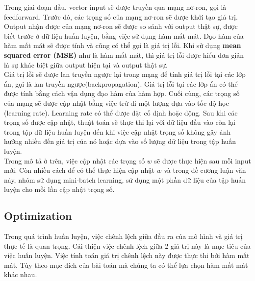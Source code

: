 Trong giai đoạn đầu, vector input sẽ được truyền qua mạng nơ-ron, gọi là feedforward. Trước đó, các trọng số của mạng nơ-ron sẽ được khởi tạo giá trị. Output nhận được của mạng nơ-ron sẽ được so sánh với output thật sự, được biết trước ở dữ liệu huấn luyện, bằng việc sử dụng hàm mất mát. Đạo hàm của hàm mất mát sẽ được tính và cũng có thể gọi là giá trị lỗi. Khi sử dụng \textbf{mean squared error (MSE)} như là hàm mất mát, thì giá trị lỗi được hiểu đơn giản là sự khác biệt giữa output hiện tại và output thật sự. \\

Giá trị lỗi sẽ được lan truyền ngược lại trong mạng để tính giá trị lỗi tại các lớp ẩn, gọi là lan truyền ngược(backpropagation). Giá trị lỗi tại các lớp ẩn có thể được tính bằng cách vận dụng đạo hàm của hàm hợp. Cuối cùng, các trọng số của mạng sẽ được cập nhật bằng việc trừ đi một lượng dựa vào tốc độ học (learning rate). Learning rate có thể được đặt cố định hoặc động. Sau khi các trọng số được cập nhật, thuật toán sẽ thực thi lại với dữ liệu đầu vào còn lại trong tập dữ liệu huấn luyện đến khi việc cập nhật trọng số không gây ảnh hưởng nhiều đến giá trị của nó hoặc  dựa vào số lượng dữ liệu trong tập huấn luyện. \\

Trong mô tả ở trên, việc cập nhật các trọng số $w$ sẽ được thực hiện sau mỗi input mới. Còn nhiều cách để có thể thực hiện cập nhật $w$ và trong đề cương luận văn này, nhóm sử dụng mini-batch learning, sử dụng một phần dữ liệu của tập huấn luyện cho mỗi lần cập nhật trọng số.

\subsection{Optimization}

Trong quá trình huấn luyện, việc chênh lệch giữa đầu ra của mô hình và giá trị thực tế là quan trọng. Cải thiện việc chênh lệch giữa 2 giá trị này là mục tiêu của việc huấn luyện. Việc tính toán giá trị chênh lệch này được thực thi bởi hàm mất mát. Tùy theo mục đích của bài toán mà chúng ta có thể lựa chọn hàm mất mát khác nhau.\\


